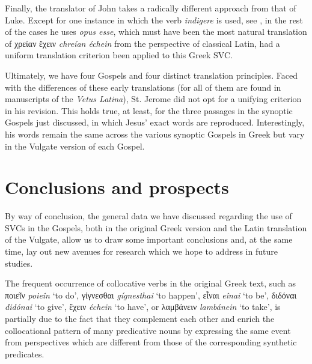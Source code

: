 \documentclass[output=paper,colorlinks,citecolor=brown]{langscibook}
\begin{document}
Finally, the translator of John takes a radically different approach from that of Luke.
Except for one instance in which the verb \emph{indigere} is used, see , in the
rest of the cases he uses \emph{opus esse}, which must have been the most natural
translation of χρείαν ἔχειν \emph{chreían échein} from the perspective of classical
Latin, had a uniform translation criterion been applied to this Greek SVC.


Ultimately, we have four Gospels and four distinct translation principles. Faced with the
differences of these early translations (for all of them are found in manuscripts of the
\emph{Vetus Latina}), St. Jerome did not opt for a unifying criterion in his revision. This holds
true, at least, for the three passages in the synoptic Gospels just discussed, in which
Jesus' exact words are reproduced. Interestingly, his words remain the same across the
various synoptic Gospels in Greek but vary in the Vulgate version of each Gospel.

\section{Conclusions and prospects}\label{sec:bj:5}

By way of conclusion, the general data we have discussed regarding the use of SVCs in the
Gospels, both in the original Greek version and the Latin translation of the Vulgate,
allow us to draw some important conclusions and, at the same time, lay out new avenues for
research which we hope to address in future studies.

The frequent occurrence of collocative verbs in the original Greek text, such as ποιεῖν
\emph{poieîn} `to do', γίγνεσθαι \emph{gígnesthai} `to happen', εἶναι \emph{eînai}
`to be', διδόναι \emph{didónai} `to give', ἔχειν \emph{échein} `to have', or λαμβάνειν
\emph{lambánein} `to take', is partially due to the fact that they complement each other
and enrich the collocational pattern of many predicative nouns by expressing the same
event from perspectives which are different from those of the corresponding synthetic
predicates.

\end{document}
